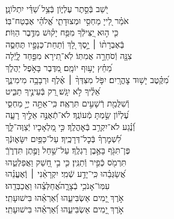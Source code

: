 \documentclass[twoside, openany, parskip=half, 11pt]{book}
\begin{document}
\begin{narrow}
יֹ֭שֵׁב בְּֿסֵ֣תֶר עֶלְי֑וֹן
\hfill בְּֿצֵ֥ל שַׁ֝דַּ֗י יִתְלוֹנָֽן׃ \\
אֹמַ֗ר לַ֭ייָ מַחְסִ֣י וּמְצוּדָתִ֑י \hfill אֱ֝לֹהַ֗י אֶבְטַח־בּֽוֹ׃ \\
כִּ֤י ה֣וּא יַ֭צִּילְֿךָ מִפַּ֥ח יָק֗וּשׁ \hfill מִדֶּ֥בֶר הַוּֽוֹת׃ \\
בְּֿאֶבְרָת֨וֹ ׀ יָ֣סֶךְ לָ֭ךְ \hfill וְֿתַחַת־כְּנָפָ֣יו תֶּחְסֶ֑ה\\ צִנָּ֖ה וְֿסֹחֵרָ֣ה אֲמִתּֽוֹ׃ \hfill
לֹֽא־תִ֭ירָא מִפַּ֣חַד לָ֑יְֿלָה\\ מֵ֝חֵ֗ץ יָע֥וּף יוֹמָֽם׃ \hfill
מִ֭דֶּבֶר בָּאֹ֣פֶל יַהֲלֹ֑ךְ \\ מִ֝קֶּ֗טֶב יָשׁ֥וּד צׇהֳרָֽיִם׃ \hfill
יִפֹּ֤ל מִצִּדְּךָ֨ ׀ אֶ֗לֶף וּרְבָבָ֥ה מִימִינֶ֑ךָ\\ אֵ֝לֶ֗יךָ לֹ֣א יִגָּֽשׁ׃ \hfill
רַ֭ק בְּֿעֵינֶ֣יךָ תַבִּ֑יט\\ וְֿשִׁלֻּמַ֖ת רְֿשָׁעִ֣ים תִּרְאֶֽה׃ \hfill
כִּֽי־אַתָּ֣ה יְיָ֣ מַחְסִ֑י\\ עֶ֝לְי֗וֹן שַׂ֣מְתָּ מְֿעוֹנֶֽךָ׃ \hfill
לֹא־תְֿאֻנֶּ֣ה אֵלֶ֣יךָ רָעָ֑ה\\ וְֿ֝נֶ֗גַע לֹא־יִקְרַ֥ב בְּֿאׇהֳלֶֽךָ׃ \hfill
כִּ֣י מַ֭לְאָכָיו יְֿצַוֶּה־לָּ֑ךְ\\ לִ֝שְׁמׇרְךָ֗ בְּֿכׇל־דְּרָכֶֽיךָ׃ \hfill
עַל־כַּפַּ֥יִם יִשָּׂא֑וּנְֿךָ\\ פֶּן־תִּגֹּ֖ף בָּאֶ֣בֶן רַגְלֶֽךָ׃ \hfill
עַל־שַׁ֣חַל וָפֶ֣תֶן תִּדְרֹ֑ךְֿ\\ תִּרְמֹ֖ס כְּֿפִ֣יר וְֿתַנִּֽין׃ \hfill
כִּ֤י בִ֣י חָ֭שַׁק וַאֲפַלְּטֵ֑הוּ\\ אֲ֝שַׂגְּבֵ֗הוּ כִּֽי־יָדַ֥ע שְֿׁמִֽי׃ \hfill
יִקְרָאֵ֨נִי ׀ וְֽֿאֶעֱנֵ֗הוּ\\ עִמּֽוֹ־אָנֹכִ֥י בְֿצָרָ֑ה\hfill אֲ֝חַלְּצֵ֗הוּ וַאֲכַבְּדֵֽהוּ׃ \\
אֹ֣רֶךְ יָ֭מִים אַשְׂבִּיעֵ֑הוּ \hfill וְֿ֝אַרְאֵ֗הוּ בִּישׁוּעָתִֽי׃ \\
\scriptsize{אֹ֣רֶךְ יָ֭מִים אַשְׂבִּיעֵ֑הוּ \hfill וְֿ֝אַרְאֵ֗הוּ בִּישׁוּעָתִֽי׃ \\}
\normalsize{}


\end{narrow}
\end{document}
